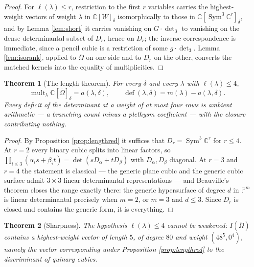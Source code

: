 \documentclass[11pt,reqno]{amsart}
\theoremstyle{plain}
\newtheorem{theorem}{Theorem}[section]
\theoremstyle{definition}
\DeclareMathOperator{\Sym}{Sym}
\DeclareMathOperator{\mult}{mult}
\DeclareMathOperator{\dfc}{def}
\newcommand{\cO}{\overline{\Omega}}
\newcommand{\bC}{\mathbb{C}}
\begin{document}
\begin{proof}
For $\ell(\lambda)\le r$, restriction to the first $r$ variables carries the
highest-weight vectors of weight $\lambda$ in $\bC[W]_\delta$ isomorphically
to those in $\bC[\Sym^{3}\bC^{r}]_\delta$, and by Lemma \ref{lem:short} it
carries vanishing on $G\cdot\det_3$ to vanishing on the dense determinantal
subset of $D_r$, hence on $D_r$; the inverse correspondence is immediate,
since a pencil cubic is a restriction of some $g\cdot\det_3$.  Lemma
\ref{lem:isorank}, applied to $\cO$ on one side and to $D_r$ on the other,
converts the matched kernels into the equality of multiplicities.
\end{proof}

\begin{theorem}[The length theorem]\label{thm:length}
For every $\delta$ and every $\lambda$ with $\ell(\lambda)\le4$,
\[
  \mult_\lambda\bC[\cO]_\delta=a(\lambda,\delta),
  \qquad
  \dfc(\lambda,\delta)=m(\lambda)-a(\lambda,\delta) .
\]
Every deficit of the determinant at a weight of at most four rows is ambient
arithmetic --- a branching count minus a plethysm coefficient --- with the
closure contributing nothing.
\end{theorem}

\begin{proof}
By Proposition \ref{prop:lengthred} it suffices that $D_r=\Sym^{3}\bC^{r}$ for
$r\le4$.  At $r=2$ every binary cubic splits into linear factors, so
$\prod_{i\le3}(\alpha_is+\beta_it)=\det(sD_\alpha+tD_\beta)$ with
$D_\alpha,D_\beta$ diagonal.  At $r=3$ and $r=4$ the statement is classical
--- the generic plane cubic and the generic cubic surface admit $3\times3$
linear determinantal representations --- and Beauville's theorem \cite{Beau}
closes the range exactly there: the generic hypersurface of degree $d$ in
$\mathbb{P}^{m}$ is linear determinantal precisely when $m=2$, or $m=3$ and $d\le3$.
Since $D_r$ is closed and contains the generic form, it is everything.
\end{proof}

\begin{theorem}[Sharpness]\label{thm:sharp}
The hypothesis $\ell(\lambda)\le4$ cannot be weakened: $I(\cO)$ contains a
highest-weight vector of length $5$, of degree $80$ and weight
$(48^{5},0^{4})$, namely the vector corresponding under Proposition
\ref{prop:lengthred} to the discriminant of quinary cubics.
\end{theorem}
\end{document}
